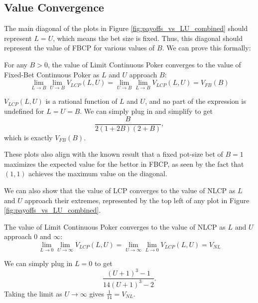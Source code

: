 \documentclass[../../main/main.tex]{subfiles}
\begin{document}
\subsection{Value Convergence}

The main diagonal of the plots in Figure \ref{fig:payoffs_vs_LU_combined} should represent $L=U$, which means the bet size is fixed. Thus, this diagonal should represent the value of FBCP for various values of $B$. We can prove this formally:

\begin{theorem}
    For any $B > 0$, the value of Limit Continuous Poker converges to the value of Fixed-Bet Continuous Poker as $L$ and $U$ approach $B$:
\[
\lim_{L \to B} \lim_{U \to B} V_{LCP}(L, U) = \lim_{U \to B} \lim_{L \to B} V_{LCP}(L, U) = V_{FB}(B)
\]
\end{theorem}

\begin{customproof}
    $V_{LCP}(L, U)$ is a rational function of $L$ and $U$, and no part of the expression is undefined for $L = U = B$. We can simply plug in and simplify to get
    $$ \frac{B}{2(1+2B)(2+B)}, $$
    which is exactly $V_{FB}(B)$.
\end{customproof}

These plots also align with the known result that a fixed pot-size bet of $B=1$ maximizes the expected value for the bettor in FBCP, as seen by the fact that $(1, 1)$ achieves the maximum value on the diagonal. 

We can also show that the value of LCP converges to the value of NLCP as $L$ and $U$ approach their extremes, represented by the top left of any plot in Figure \ref{fig:payoffs_vs_LU_combined}.

\begin{theorem}
    The value of Limit Continuous Poker converges to the value of NLCP as $L$ and $U$ approach $0$ and $\infty$:
\[
\lim_{L \to 0} \lim_{U \to \infty} V_{LCP}(L, U) = \lim_{U \to \infty} \lim_{L \to 0} V_{LCP}(L, U) = V_{NL}
\]
\end{theorem}
\begin{customproof}
    We can simply plug in $L=0$ to get
    $$\frac{(U+1)^3-1}{14 (U+1)^3-2}.$$
    Taking the limit as $U \to \infty$ gives $\frac{1}{14} = V_{NL}$.
\end{customproof}
\end{document}
